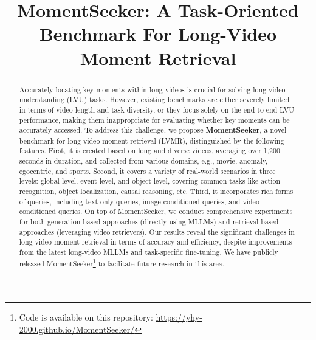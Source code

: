\documentclass{article}
\title{MomentSeeker: A Task-Oriented Benchmark For Long-Video Moment Retrieval}
\begin{document}
\newcommand*\samethanks[1][\value{footnote}]{\footnotemark[#1]}
\maketitle

\setcounter{footnote}{0}

\begin{abstract} 


Accurately locating key moments within long videos is crucial for solving long video understanding (LVU) tasks. However, existing benchmarks are either severely limited in terms of video length and task diversity, or they focus solely on the end-to-end LVU performance, making them inappropriate for 
evaluating whether key moments can be accurately accessed. To address this challenge, we propose \textbf{MomentSeeker}, a novel benchmark for long-video moment retrieval (LVMR), distinguished by the following features. First, it is created based on long and diverse videos, averaging over 1,200 seconds in duration, and collected from various domains, e.g., movie, anomaly, egocentric, and sports. Second, it covers a variety of real-world scenarios in three levels: global-level, event-level, and object-level, covering common tasks like action recognition, object localization,  causal reasoning, etc. Third, it incorporates rich forms of queries, including text-only queries, image-conditioned queries, and video-conditioned queries. On top of MomentSeeker, we conduct comprehensive experiments for both generation-based approaches (directly using MLLMs) and retrieval-based approaches (leveraging video retrievers). Our results reveal the significant challenges in long-video moment retrieval in terms of accuracy and efficiency, despite improvements from the latest long-video MLLMs and task-specific fine-tuning. We have publicly released MomentSeeker\footnote{Code is available on this repository: \url{https://yhy-2000.github.io/MomentSeeker/}} to facilitate future research in this area. 
\end{abstract}

\end{document}
